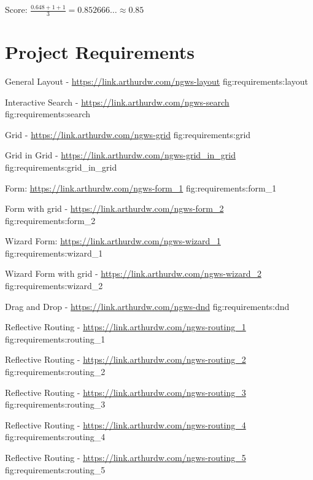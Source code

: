 Score: $\frac{0.648 + 1 + 1}{3} = 0.852666\dots \approx 0.85$


\chapter{Project Requirements}

{General Layout - \url{https://link.arthurdw.com/ngws-layout}}
{fig:requirements:layout}

{Interactive Search - \url{https://link.arthurdw.com/ngws-search}}
{fig:requirements:search}

{Grid - \url{https://link.arthurdw.com/ngws-grid}}
{fig:requirements:grid}

{Grid in Grid - \url{https://link.arthurdw.com/ngws-grid_in_grid}}
{fig:requirements:grid_in_grid}

{Form: \url{https://link.arthurdw.com/ngws-form_1}}
{fig:requirements:form_1}

{Form with grid - \url{https://link.arthurdw.com/ngws-form_2}}
{fig:requirements:form_2}

{Wizard Form: \url{https://link.arthurdw.com/ngws-wizard_1}}
{fig:requirements:wizard_1}

{Wizard Form with grid - \url{https://link.arthurdw.com/ngws-wizard_2}}
{fig:requirements:wizard_2}

{Drag and Drop - \url{https://link.arthurdw.com/ngws-dnd}}
{fig:requirements:dnd}

{Reflective Routing - \url{https://link.arthurdw.com/ngws-routing_1}}
{fig:requirements:routing_1}

{Reflective Routing - \url{https://link.arthurdw.com/ngws-routing_2}}
{fig:requirements:routing_2}

{Reflective Routing - \url{https://link.arthurdw.com/ngws-routing_3}}
{fig:requirements:routing_3}

{Reflective Routing - \url{https://link.arthurdw.com/ngws-routing_4}}
{fig:requirements:routing_4}

{Reflective Routing - \url{https://link.arthurdw.com/ngws-routing_5}}
{fig:requirements:routing_5}

